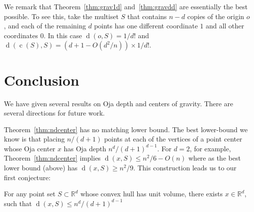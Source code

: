 \documentclass{cccg10}
\DeclareMathOperator{\od}{d}
\DeclareMathOperator{\cog}{c}
\newcommand{\R}{\mathbb{R}}
\begin{document}
We remark that Theorem~\ref{thm:grav1d} and~\ref{thm:gravdd} are essentially the best possible. To see this, take the multiset $S$ that contains $n-d$ copies of the origin $o$, and each of the remaining $d$ points has one different coordinate $1$ and all other coordinates $0$. In this case $\od(o, S)= 1/d!$ and $\od(\cog(S), S)= (d + 1 - O(d^2/n))\times 1/d!$.

\section{Conclusion}
\label{sec:concl}

We have given several results on Oja depth and centers of gravity.
There are several directions for future work.

Theorem~\ref{thm:ndcenter} has no matching lower bound.  The best lower-bound
we know is that placing $n/(d+1)$ points at each of the vertices of a
point center whose Oja center $x$ has Oja depth $n^d / (d+1)^{d-1}$.
For $d=2$, for example, Theorem~\ref{thm:ndcenter} implies $\od(x, S)\le n^2/6
- O(n)$ where as the best lower bound (above) has $\od(x, S)\ge n^2/9$.
This construction leads us to our first conjecture:
\begin{conj}
For any point set $S\subset\R^d$ whose convex hull has unit volume, there exists $x\in\R^d$, such that $\od(x,S)\le n^d / (d+1)^{d-1}$
\end{conj}


\small 


\end{document}
